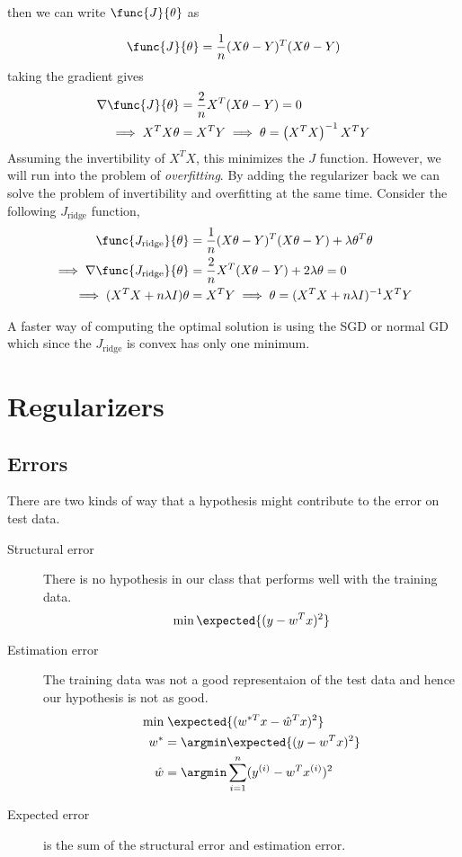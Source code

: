 then we can write \(\func{J}{\theta}\) as

\begin{equation*}
    \func{J}{\theta} = \frac{1}{n} (X\theta - Y)^T (X\theta-Y)
\end{equation*}
taking the gradient gives 
\begin{align*}
    \nabla \func{J}{\theta} &= \dfrac{2}{n} X^T (X\theta - Y) = 0\\
    \implies  X^T X\theta &= X^T Y \implies \theta = \left(X^T X\right)^{-1} X^T Y
\end{align*}
Assuming the invertibility of \(X^TX\), this minimizes the \(J\) function. However, we will run into the problem of \textit{overfitting}. By adding the regularizer back we can solve the problem of invertibility and overfitting at the same time. Consider the following \(J_{\mathrm{ridge}}\) function, 
\begin{align*}
    \func{J_{\mathrm{ridge}}}{\theta} &= \frac{1}{n} (X\theta - Y)^T (X\theta-Y) + \lambda \theta^T \theta \\
     \implies \nabla \func{J_{\mathrm{ridge}}}{\theta} &= \dfrac{2}{n} X^T (X\theta - Y) + 2\lambda \theta  = 0\\ 
     \implies  (X^TX + n \lambda I) \theta &= X^T Y \implies \theta  = (X^TX + n \lambda I )^{-1} X^T Y
\end{align*}

A faster way of computing the optimal solution is using the SGD or normal GD which since the \(J_{\mathrm{ridge}}\) is convex has only one minimum.

\section{Regularizers}
\subsection{Errors}
There are two kinds of way that a hypothesis might contribute to the error on test data.
\begin{description}
    \item [Structural error] There is no hypothesis in our class that performs well with the training data.
    \begin{equation*}
        \min \expected{(y - w^Tx)^2}
    \end{equation*}
    \item [Estimation error] The training data was not a good representaion of the test data and hence our hypothesis is not as good.
    \begin{align*}
        \min &\; \expected{(w^{\ast T} x - \hat{w}^T x)^2}\\
        w^\ast &= \argmin \expected{(y - w^Tx)^2}\\
        \hat{w} &= \argmin \sum_{i= 1}^{n} (y^{(i)} - w^T x^{(i)})^2 
    \end{align*}
    \item [Expected error] is the sum of the structural error and estimation error.
\end{description}